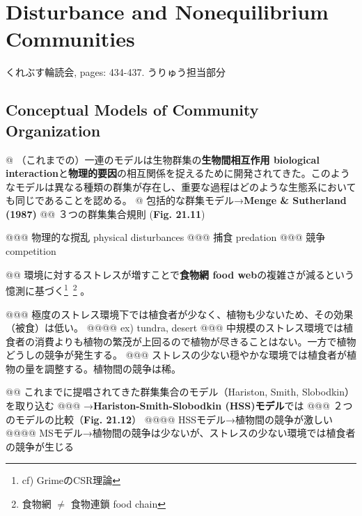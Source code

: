 \documentclass[12pt, report, a4paper]{jsbook}
\newcommand{\xAlert}[1]{{\textbf{\textcolor[cmyk]{1, 0.50, 0, 0}{#1}}}}
\begin{document}

\setcounter{chapter}{20}
\chapter{\huge{Disturbance and Nonequilibrium Communities}}
 くれぶす輪読会, pages: 434-437. うりゅう担当部分
\section*{Conceptual Models of Community Organization}

\begin{easylist}[itemize]
@ （これまでの）一連のモデルは生物群集の\xAlert{生物間相互作用 biological interaction}と\xAlert{物理的要因}の相互関係を捉えるために開発されてきた。このようなモデルは異なる種類の群集が存在し、重要な過程はどのような生態系においても同じであることを認める。
@ 包括的な群集モデル→\textbf{Menge \& Sutherland (1987)}\cite{Menge:1987ud}
@@ ３つの群集集合規則 (\textbf{Fig. 21.11})
\end{easylist}

\begin{easylist}[enumerate]
@@@ 物理的な撹乱 physical disturbances
@@@ 捕食 predation
@@@ 競争 competition
\end{easylist}
\begin{easylist}[itemize]
@@ 環境に対するストレスが増すことで\xAlert{食物網 food web}の複雑さが減るという憶測に基づく\footnote{cf) GrimeのCSR理論}\ \footnote{食物網 $ \not= $ 食物連鎖 food chain}
。
\end{easylist}
\begin{easylist}[enumerate]
@@@ 極度のストレス環境下では植食者が少なく、植物も少ないため、その効果（被食）は低い。
@@@@ ex) tundra, desert
@@@ 中規模のストレス環境では植食者の消費よりも植物の繁茂が上回るので植物が尽きることはない。一方で植物どうしの競争が発生する。
@@@ ストレスの少ない穏やかな環境では植食者が植物の量を調整する。植物間の競争は稀。
\end{easylist}
\begin{easylist}[itemize]
@@ これまでに提唱されてきた群集集合のモデル（Hariston, Smith, Slobodkin）を取り込む
@@@ →\textbf{Hariston-Smith-Slobodkin (HSS)モデル}では
@@@ ２つのモデルの比較（\textbf{Fig. 21.12}）
@@@@ HSSモデル→植物間の競争が激しい
@@@@ MSモデル→植物間の競争は少ないが、ストレスの少ない環境では植食者の競争が生じる
\end{easylist}
\end{document}
